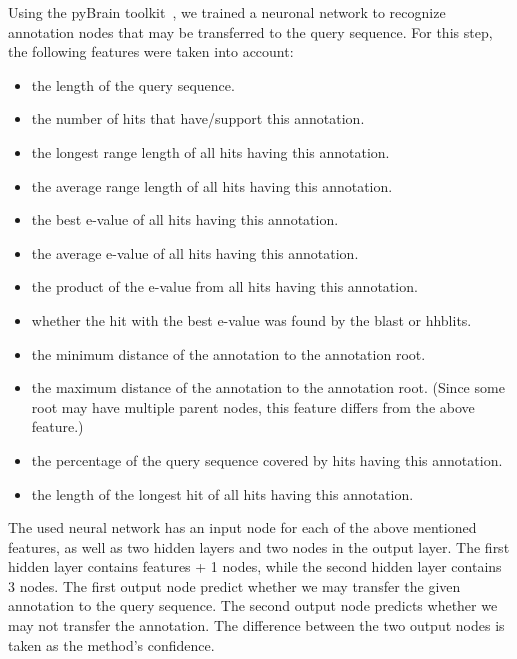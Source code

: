 Using the pyBrain toolkit~\citep{schaul2010}, we trained a neuronal network to recognize annotation nodes that may be transferred to the query sequence. For this step, the following features were taken into account:
\begin{itemize}
\item the length of the query sequence.
\item the number of hits that have/support this annotation.
\item the longest range length of all hits having this annotation.
\item the average range length of all hits having this annotation.
\item the best e-value of all hits having this annotation.
\item the average e-value of all hits having this annotation.
\item the product of the e-value from all hits having this annotation.
\item whether the hit with the best e-value was found by the blast or hhblits.
\item the minimum distance of the annotation to the annotation root.
\item the maximum distance of the annotation to the annotation root. (Since some root may have multiple parent nodes, this feature differs from the above feature.)
\item the percentage of the query sequence covered by hits having this annotation.
\item the length of the longest hit of all hits having this annotation.
\end{itemize}
The used neural network has an input node for each of the above mentioned features, as well as two hidden layers and two nodes in the output layer. The first hidden layer contains features + 1 nodes, while the second hidden layer
contains 3 nodes. The first output node predict whether we may transfer the given annotation to the query sequence. The second output node predicts whether we may not transfer the annotation.
The difference between the two output nodes is taken as the method's confidence.
